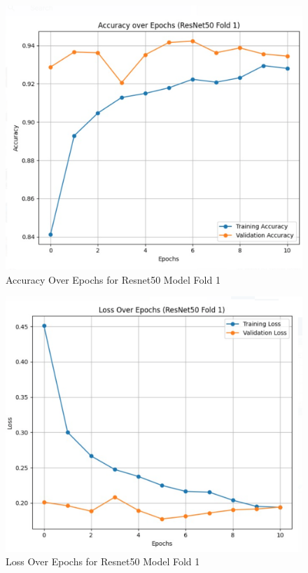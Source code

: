 \documentclass[conference]{IEEEtran}
\begin{document}
\begin{figure} 
    \centering
    \includegraphics[width=\linewidth]{img/accuracyResnet50.png}
    \caption{Accuracy Over Epochs for Resnet50 Model Fold 1}
    \label{fig:accResnet}
\end{figure}

\begin{figure} 
    \centering
    \includegraphics[width=\linewidth]{img/lossResnet50.png}
    \caption{Loss Over Epochs for Resnet50 Model Fold 1}
    \label{fig:lossResnet}
\end{figure}
\end{document}
